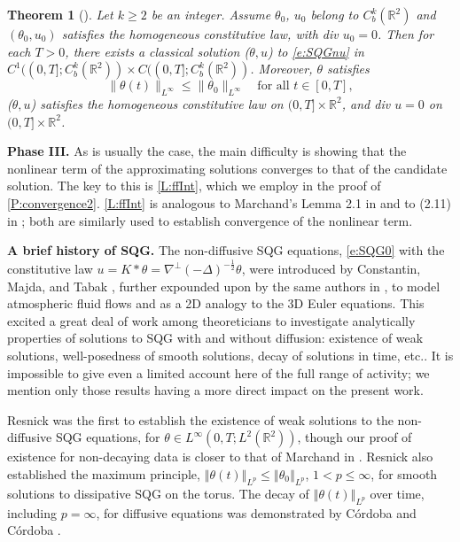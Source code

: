 \documentclass[11pt,reqno,xcolor=svgnames]{amsart}
\def\R{{\mathbb R}}
\theoremstyle{plain}
\newtheorem{theorem}{Theorem}[section]
\theoremstyle{definition}
\theoremstyle{plain}
\theoremstyle{remark}
\newcommand{\iny}{\ensuremath{\infty}}
\newcommand{\grad}{\ensuremath{\nabla}}
\newcommand{\norm}[1]{\ensuremath{\left\Vert #1 \right\Vert}}
\begin{document}
\begin{theorem}[\cite{AACK25}]\label{T:SQG1}
Let $k\geq 2$ be an integer. Assume $\theta_0$, $u_0$ belong to $C^k_b(\R^2)$ and $(\theta_0,u_0)$ satisfies the homogeneous constitutive law, with div $u_0=0$.  Then for each $T>0$, there exists a classical solution ($\theta,u$) to \cref{e:SQGnu} in $C^1( (0,T]; C^k_b(\R^2) ) \times C( (0,T]; C^k_b(\R^2) )$. Moreover, $\theta$ satisfies
\begin{equation}\label{max}
\| \theta (t) \|_{L^{\infty}} \leq \|\theta_0 \|_{L^{\infty}} \quad \text{for all } t\in [0,T],
\end{equation}
($\theta,u$) satisfies the homogeneous constitutive law on $(0,T]\times \R^2$, and div $u=0$ on $(0,T]\times \R^2$. 
\end{theorem}



\smallskip\noindent\textbf{Phase III.}
As is usually the case, the main difficulty is showing that the nonlinear term of the approximating solutions converges to that of the candidate solution. The key to this is \cref{L:ffInt}, which we employ in the proof of \cref{P:convergence2}. \cref{L:ffInt} is analogous to Marchand's Lemma 2.1 in \cite{Marchand} and to (2.11) in \cite{Resnick}; both are similarly used to establish convergence of the nonlinear term.

\smallskip\noindent\textbf{A brief history of SQG.}
The non-diffusive SQG equations, \cref{e:SQG0} with the constitutive law $u = K * \theta = \grad^\perp (-\Delta)^{-\frac{1}{2}} \theta$, were introduced by Constantin, Majda, and Tabak \cite{ConstantinMajdaTabak1994A}, further expounded upon by the same authors in \cite{ConstantinMajdaTabak1994B}, to model atmospheric fluid flows and as a 2D analogy to the 3D Euler equations. This excited a great deal of work among theoreticians to investigate analytically properties of solutions to SQG with and without diffusion: existence of weak solutions, well-posedness of smooth solutions, decay of solutions in time, 
etc.. It is impossible to give even a limited account here of the full range of activity; we mention only those results having a more direct impact on the present work.

Resnick \cite{Resnick} was the first to establish the existence of weak solutions to the non-diffusive SQG equations, for $\theta \in L^\iny(0, T; L^2(\R^2))$, though our proof of existence for non-decaying data is closer to that of Marchand in \cite{Marchand}. Resnick also established the maximum principle, $\norm{\theta(t)}_{L^p} \le \norm{\theta_0}_{L^p}$, $1 < p \le \iny$, for smooth solutions to dissipative SQG on the torus. The decay of $\norm{\theta(t)}_{L^p}$ over time, including $p = \iny$, for diffusive equations was demonstrated by C\'ordoba and C\'ordoba \cite{cordoba2004maximum}.
\end{document}
